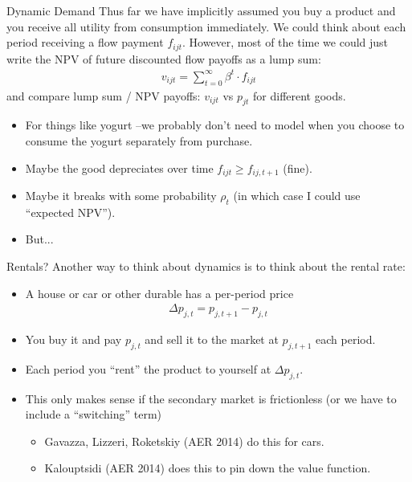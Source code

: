 \documentclass[xcolor=pdftex,dvipsnames,table,mathserif,aspectratio=169]{beamer}
\begin{document}
\begin{frame}{Dynamic Demand}
Thus far we have implicitly assumed you buy a product and you receive all utility from consumption immediately. We could think about each period receiving a \alert{flow payment} $f_{ijt}$. However, most of the time we could just write the NPV of future discounted flow payoffs as a \alert{lump sum}:
\begin{align*}
v_{ijt} = \sum_{t=0}^{\infty} \beta^t \cdot f_{ijt}
\end{align*}
and compare lump sum / NPV payoffs: $v_{ijt}$ vs $p_{jt}$ for different goods.
\begin{itemize}
\item For things like yogurt --we probably don't need to model when you choose to consume the yogurt separately from purchase.
\item Maybe the good depreciates over time $f_{ijt} \geq f_{ij,t+1}$ (fine).
\item Maybe it breaks with some probability $\rho_t$ (in which case I could use ``expected NPV'').
\item But...
\end{itemize}
\end{frame}



\begin{frame}{Rentals?}
Another way to think about dynamics is to think about the rental rate:
\begin{itemize}
\item A house or car or other durable has a per-period price
\begin{align*}
\Delta p_{j,t}=p_{j,t+1} - p_{j,t}
\end{align*}
\item You buy it and pay $p_{j,t}$ and sell it to the market at $p_{j,t+1}$ each period.
\item Each period you ``rent'' the product to yourself at $\Delta p_{j,t}$.
\item This only makes sense if the secondary market is frictionless (or we have to include a ``switching'' term)
\begin{itemize}
	\item Gavazza, Lizzeri, Roketskiy (AER 2014) do this for cars.
	\item Kalouptsidi (AER 2014) does this to pin down the value function.
\end{itemize}
\end{itemize}
\end{frame}
\end{document}
